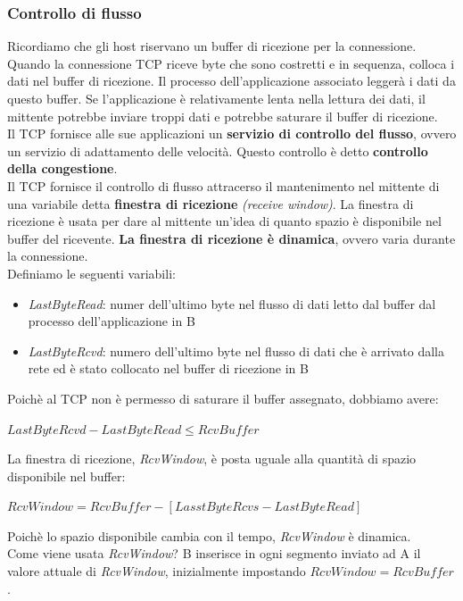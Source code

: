 \documentclass[11pt,a4paper]{article}
\begin{document}
\subsubsection{Controllo di flusso}
Ricordiamo che gli host riservano un buffer di ricezione per la connessione. Quando la connessione TCP riceve byte che sono costretti e in sequenza, colloca i dati nel buffer di ricezione. Il processo dell'applicazione associato leggerà i dati da questo buffer. Se l'applicazione è relativamente lenta nella lettura dei dati, il mittente potrebbe inviare troppi dati e potrebbe saturare il buffer di ricezione. \\
Il TCP fornisce alle sue applicazioni un \textbf{servizio di controllo del flusso}, ovvero un servizio di adattamento delle velocità. Questo controllo è detto \textbf{controllo della congestione}. \\
Il TCP fornisce il controllo di flusso attracerso il mantenimento nel mittente di una variabile detta \textbf{finestra di ricezione} \textit{(receive window)}. La finestra di ricezione è usata per dare al mittente un'idea di quanto spazio è disponibile nel buffer del ricevente. \textbf{La finestra di ricezione è dinamica}, ovvero varia durante la connessione. \\
Definiamo le seguenti variabili:
\begin{itemize}
	\item \emph{LastByteRead}: numer dell'ultimo byte nel flusso di dati letto dal buffer dal processo dell'applicazione in B
	\item \emph{LastByteRcvd}: numero dell'ultimo byte nel flusso di dati che è arrivato dalla rete ed è stato collocato nel buffer di ricezione in B
\end{itemize}
Poichè al TCP non è permesso di saturare il buffer assegnato, dobbiamo avere:
\begin{center}
	$LastByteRcvd - LastByteRead \leq RcvBuffer$
\end{center}
La finestra di ricezione, \emph{RcvWindow}, è posta uguale alla quantità di spazio disponibile nel buffer:
\begin{center}
	$RcvWindow = RcvBuffer - [LasstByteRcvs - LastByteRead]$
\end{center}
Poichè lo spazio disponibile cambia con il tempo, \emph{RcvWindow} è dinamica. \\
Come viene usata \emph{RcvWindow}? B inserisce in ogni segmento inviato ad A il valore attuale di \emph{RcvWindow}, inizialmente impostando $RcvWindow = RcvBuffer$. \\
\end{document}

